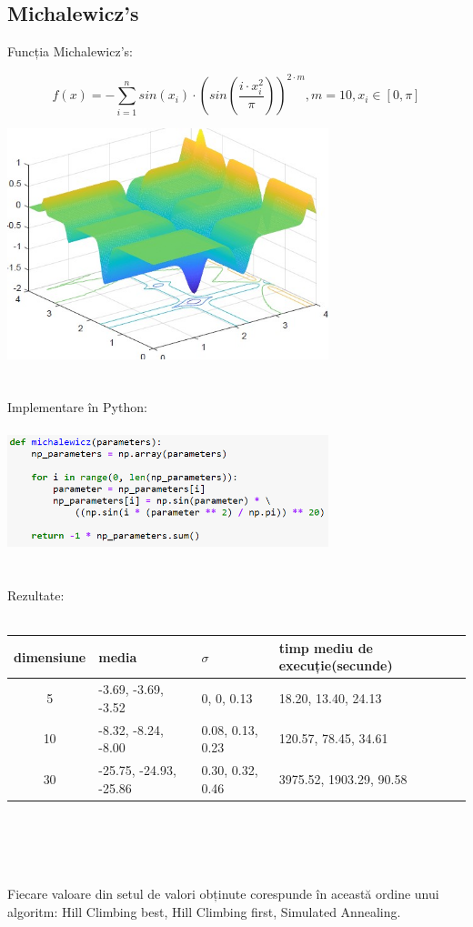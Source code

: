 \documentclass{article}
\begin{document}
\subsection*{Michalewicz's}
Funcția Michalewicz's:

$$ f(x) = - \sum_{i=1}^n sin(x_i) \cdot \left(sin\left( \frac{i \cdot x_i^ 2}{\pi} \right)\right)^{2 \cdot m} , m = 10, x_i \in \left[ 0, \pi \right]$$

\includegraphics[width=0.7\textwidth]{michalewicz}\\\\\\
Implementare în Python:\\\\
\includegraphics[width=0.7\textwidth]{4d}\\\\\\
Rezultate:\\\\
\begin{tabular}{||c|||l|l|l||}
  \hline
  dimensiune & media & $\sigma$ & timp mediu de execuție(secunde)\\ \hline \hline
  5	  & -3.69, -3.69, -3.52 & 0, 0, 0.13 & 18.20, 13.40, 24.13 \\ \hline
  10  & -8.32, -8.24, -8.00 & 0.08, 0.13, 0.23 & 120.57, 78.45, 34.61 \\ \hline
  30  & -25.75, -24.93, -25.86 & 0.30, 0.32, 0.46 & 3975.52, 1903.29, 90.58 \\ \hline
\end{tabular}\\\\\\\\
Fiecare valoare din setul de valori obținute corespunde în această ordine unui algoritm: Hill Climbing best, Hill Climbing first, Simulated Annealing.
\end{document}
